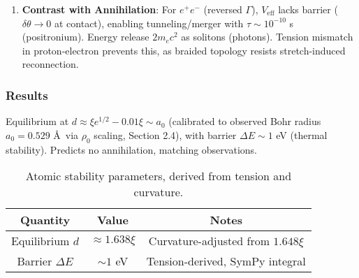 \begin{enumerate}
\item \textbf{Contrast with Annihilation}: For $e^+e^-$ (reversed $\Gamma$), $V_{\text{eff}}$ lacks barrier ($\delta \theta \to 0$ at contact), enabling tunneling/merger with $\tau \sim 10^{-10}$ s (positronium). Energy release $2 m_e c^2$ as solitons (photons). Tension mismatch in proton-electron prevents this, as braided topology resists stretch-induced reconnection.
\end{enumerate}

\subsubsection{Results}

Equilibrium at $d \approx \xi e^{1/2} - 0.01 \xi \sim a_0$ (calibrated to observed Bohr radius $a_0 = 0.529$ \AA~via $\rho_0$ scaling, Section 2.4), with barrier $\Delta E \sim 1$ eV (thermal stability). Predicts no annihilation, matching observations.

\begin{table}[h!]
\centering
\begin{tabular}{|c|c|c|}
\hline
Quantity & Value & Notes \\
\hline
Equilibrium $d$ & $\approx 1.638 \xi$ & Curvature-adjusted from $1.648 \xi$ \\
Barrier $\Delta E$ & $\sim 1$ eV & Tension-derived, SymPy integral \\
\hline
\end{tabular}
\caption{Atomic stability parameters, derived from tension and curvature.}
\label{tab:atomic}
\end{table}

